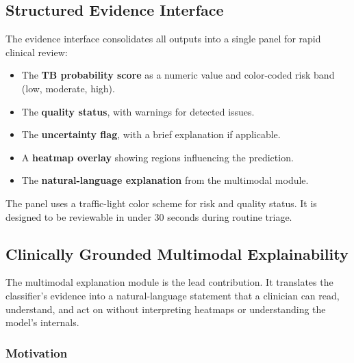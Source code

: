 \documentclass[conference, letterpaper]{IEEEtran}
\begin{document}
\subsection{Structured Evidence Interface}

The evidence interface consolidates all outputs into a single panel for rapid clinical review:

\begin{itemize}
    \item The \textbf{TB probability score} as a numeric value and color-coded risk band (low, moderate, high).
    \item The \textbf{quality status}, with warnings for detected issues.
    \item The \textbf{uncertainty flag}, with a brief explanation if applicable.
    \item A \textbf{heatmap overlay} showing regions influencing the prediction.
    \item The \textbf{natural-language explanation} from the multimodal module.
\end{itemize}


The panel uses a traffic-light color scheme for risk and quality status. It is designed to be reviewable in under 30 seconds during routine triage.

\subsection{Clinically Grounded Multimodal Explainability}

The multimodal explanation module is the lead contribution. It translates the classifier's evidence into a natural-language statement that a clinician can read, understand, and act on without interpreting heatmaps or understanding the model's internals.

\subsubsection{Motivation}
\end{document}
